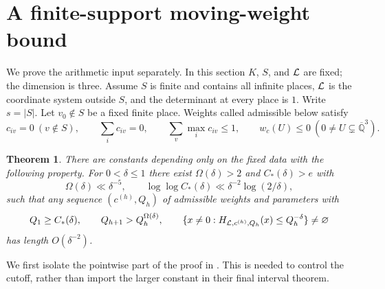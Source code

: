 \documentclass[11pt]{article}
\numberwithin{equation}{section}
\newtheorem{theorem}{Theorem}[section]
\theoremstyle{remark}\newtheorem{remark}[theorem]{Remark}
\newcommand{\Qbar}{\overline{\mathbb Q}}
\begin{document}
\section{A finite-support moving-weight bound}\label{sec:moving}
We prove the arithmetic input separately. In this section $K$, $S$, and
$\mathcal L$ are fixed; the dimension is three. Assume $S$ is finite and contains
all infinite places, $\mathcal L$ is the coordinate system outside $S$, and the
determinant at every place is $1$. Write $s=|S|$.
Let $v_0\notin S$ be a fixed finite place.
Weights called admissible below satisfy
\begin{equation}\label{eq:admissible}
 c_{iv}=0\ (v\notin S),\qquad
 \sum_i c_{iv}=0,\qquad \sum_v\max_i c_{iv}\le1,
 \qquad w_c(U)\le0\ (0\ne U\subsetneq\Qbar^3).
\end{equation}

\begin{theorem}\label{thm:sparse}
There are constants depending only on the fixed data with the following
property. For $0<\delta\le1$ there exist $\Omega(\delta)>2$ and
$C_*(\delta)>e$ with
\begin{equation}\label{eq:cutofforder}
 \Omega(\delta)\ll\delta^{-5},\qquad
 \log\log C_*(\delta)\ll\delta^{-2}\log(2/\delta),
\end{equation}
such that any sequence $(c^{(h)},Q_h)$ of admissible weights and parameters
with
\[
 Q_1\ge C_*(\delta),\qquad Q_{h+1}>Q_h^{\Omega(\delta)},\qquad
 \{x\ne0:H_{\mathcal L,c^{(h)},Q_h}(x)\le Q_h^{-\delta}\}\ne\varnothing
\]
has length $O(\delta^{-2})$.
\end{theorem}

We first isolate the pointwise part of the proof in \cite{EF13}. This is
needed to control the cutoff, rather than import the larger constant
in their final interval theorem.
\end{document}
